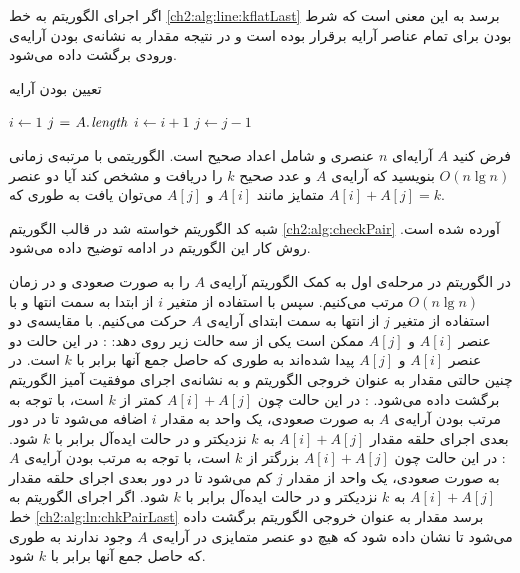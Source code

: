 اگر اجرای الگوریتم به خط {\ref{ch2:alg:line:kflatLast}} برسد به این معنی است که شرط {} بودن برای تمام عناصر آرایه برقرار بوده است و در نتیجه مقدار {} به نشانه‌ی {} بودن آرایه‌ی ورودی برگشت داده می‌شود.

\begin{algorithm}
\caption{تعیین {} بودن آرایه}\label{ch2:alg:kflat}
\begin{latin}
\begin{algorithmic}[1]
		\State	{}
		\State 	$i \gets 1$
		\State 	$j \mathrel{\hspace{1pt}=\hspace{1pt}} A.\hspace*{1pt}\mathit{length}$
						\State	\Return {}
				\Else
						\State	$i \gets i+1$
						\State	$j \gets j-1$
				\EndIf
		\EndWhile
		\State \Return {}\label{ch2:alg:line:kflatLast}
\EndFunction
\end{algorithmic}
\end{latin}
\end{algorithm}

 فرض کنید {$A$} آرایه‌ای {$n$} عنصری و شامل اعداد صحیح است. الگوریتمی با مرتبه‌ی زمانی {$O(n\lg n)$} بنویسید که آرایه‌‌ی {$A$} و عدد صحیح {$k$} را دریافت و مشخص کند آیا دو عنصر متمایز مانند {$A[i]$} و {$A[j]$} می‌توان یافت به طوری که {$A[i]+A[j]=k$}.


شبه کد الگوریتم خواسته شد در قالب الگوریتم {\ref{ch2:alg:checkPair}} آورده شده است. روش کار این الگوریتم در ادامه توضیح داده می‌شود.

در الگوریتم {} در مرحله‌ی اول به کمک الگوریتم {} آرایه‌ی {$A$} را به صورت صعودی و در زمان
 {$O(n\lg n)$} مرتب می‌کنیم. سپس با استفاده از متغیر {$i$} از ابتدا به سمت انتها و با استفاده از متغیر {$j$} از انتها به سمت ابتدای آرایه‌ی {$A$}‌ حرکت می‌کنیم. با مقایسه‌ی دو عنصر {$A[i]$} و {$A[j]$} ممکن است یکی از سه حالت زیر روی دهد:
: در این حالت دو عنصر {$A[i]$} و {$A[j]$} پیدا شده‌اند به طوری که حاصل جمع آنها برابر با {$k$} است. در چنین حالتی مقدار {} به عنوان خروجی الگوریتم و به نشانه‌ی اجرای موفقیت آمیز الگوریتم برگشت داده می‌شود.
: در این حالت چون {$A[i]+A[j]$} کمتر از {$k$} است، با توجه به مرتب بودن آرایه‌ی {$A$} به صورت صعودی، یک واحد به مقدار {$i$} اضافه می‌شود تا در دور بعدی اجرای حلقه مقدار {$A[i]+A[j]$} به {$k$} نزدیکتر و در حالت ایده‌آل برابر با {$k$} شود.
: در این حالت چون {$A[i]+A[j]$} بزرگتر از {$k$} است، با توجه به مرتب بودن آرایه‌ی {$A$} به صورت صعودی، یک واحد از مقدار {$j$} کم می‌شود تا در دور بعدی اجرای حلقه مقدار {$A[i]+A[j]$} به {$k$} نزدیکتر و در حالت ایده‌آل برابر با {$k$} شود.
اگر اجرای الگوریتم به خط {\ref{ch2:alg:ln:chkPairLast}} برسد مقدار {} به عنوان خروجی الگوریتم برگشت داده می‌شود تا نشان داده شود که هیچ دو عنصر متمایزی در آرایه‌ی {$A$} وجود ندارند به طوری که حاصل جمع آنها برابر با {$k$} شود.


